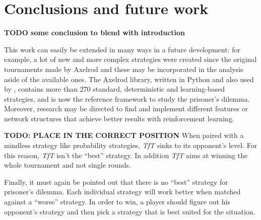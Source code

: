 \documentclass[journal,a4paper,10pt,twoside]{IEEEtran} %
\begin{document}
\section{Conclusions and future work} \label{s:conc}
\textbf{TODO some conclusion to blend with introduction}

This work can easily be extended in many ways in a future development: for example, a lot of new and more complex strategies were created since the original tournaments made by Axelrod and these may be incorporated in the analysis aside of the available ones.
The Axelrod library, \cite{Knight2016Axel,axel-lib} written in Python and also used by \cite{plosRLdominant}, contains more than 270 standard, deterministic and learning-based strategies, and is now the reference framework to study the prisoner's dilemma.
Moreover, research may be directed to find and implement different features or network structures that achieve better results with reinforcement learning.

\textbf{TODO: PLACE IN THE CORRECT POSITION}
When paired with a mindless strategy like probability strategies, \textit{TfT} sinks to its opponent's level. For this reason, \textit{TfT} isn't the ``best'' strategy. In addition \textit{TfT} aims at winning the whole tournament and not single rounds.

Finally, it must again be pointed out that there is no ``best'' strategy for prisoner's dilemma. Each individual strategy will work better when matched against a ``worse'' strategy. In order to win, a player should figure out his opponent's strategy and then pick a strategy that is best suited for the situation.

\balance



\onecolumn
{} \label{s:appendix}

\end{document}
